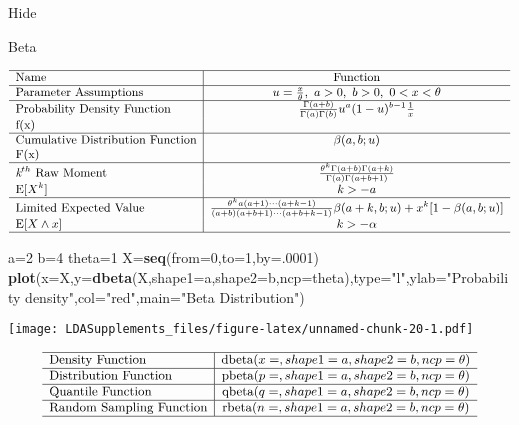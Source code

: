 \documentclass[]{book}
\newenvironment{Shaded}{\begin{snugshade}}{\end{snugshade}}
\newcommand{\KeywordTok}[1]{\textcolor[rgb]{0.13,0.29,0.53}{\textbf{#1}}}
\newcommand{\DataTypeTok}[1]{\textcolor[rgb]{0.13,0.29,0.53}{#1}}
\newcommand{\DecValTok}[1]{\textcolor[rgb]{0.00,0.00,0.81}{#1}}
\newcommand{\StringTok}[1]{\textcolor[rgb]{0.31,0.60,0.02}{#1}}
\newcommand{\NormalTok}[1]{#1}
\begin{document}
\hypertarget{fsB}{}
{Hide}

Beta

\[
{\small
\begin{matrix}
\begin{array}{l|c}
\hline
  \text{Name} & \text{Function} \\
\hline
  \text{Parameter Assumptions} & u=\frac{x}{\theta},~a>0,~b>0,~0<x<\theta \\
\hline
  \text{Probability Density Function} & \frac{\Gamma(a+b)}{\Gamma(a)\Gamma(b)} u^a(1-u)^{b-1}\frac{1}{x} \\
    \text{f(x)} & \\
\hline
  \text{Cumulative Distribution Function} & \beta(a,b;u) \\
    \text{F(x)} & \\
\hline
  \textit{k}^{th}~\text{Raw Moment} & \frac{\theta^k 
  \Gamma(a+b)\Gamma(a+k)}{\Gamma(a)\Gamma(a+b+1)} \\
  \mathrm{E}[X^k]  & k>-a \\
\hline
  \text{Limited Expected Value} & \frac{\theta^k a(a+1)\cdots(a+k-1)}{(a+b)(a+b+1)\cdots(a+b+k-1)}\beta(a+k,b;u)+x^k[1-\beta(a,b;u)]  \\
   \mathrm{E}[X\wedge x] & k > -\alpha \\
\hline
\end{array}
\end{matrix}
}
\]

\begin{Shaded}
\begin{Highlighting}[]
\NormalTok{a=}\DecValTok{2}
\NormalTok{b=}\DecValTok{4}
\NormalTok{theta=}\DecValTok{1}
\NormalTok{X=}\KeywordTok{seq}\NormalTok{(}\DataTypeTok{from=}\DecValTok{0}\NormalTok{,}\DataTypeTok{to=}\DecValTok{1}\NormalTok{,}\DataTypeTok{by=}\NormalTok{.}\DecValTok{0001}\NormalTok{)}
\KeywordTok{plot}\NormalTok{(}\DataTypeTok{x=}\NormalTok{X,}\DataTypeTok{y=}\KeywordTok{dbeta}\NormalTok{(X,}\DataTypeTok{shape1=}\NormalTok{a,}\DataTypeTok{shape2=}\NormalTok{b,}\DataTypeTok{ncp=}\NormalTok{theta),}\DataTypeTok{type=}\StringTok{"l"}\NormalTok{,}\DataTypeTok{ylab=}\StringTok{"Probability density"}\NormalTok{,}\DataTypeTok{col=}\StringTok{"red"}\NormalTok{,}\DataTypeTok{main=}\StringTok{"Beta Distribution"}\NormalTok{)}
\end{Highlighting}
\end{Shaded}

\texttt{[image: LDASupplements\_files/figure-latex/unnamed-chunk-20-1.pdf]}

\[
{\small
\begin{matrix}
\begin{array}{l|c}
\hline
  \text{Density Function} & \text{dbeta}(x=, shape1=a,shape2=b,ncp=\theta) \\
\hline
  \text{Distribution Function} & \text{pbeta}(p=, shape1=a,shape2=b,ncp=\theta) \\
\hline
  \text{Quantile Function} & \text{qbeta}(q=, shape1=a,shape2=b,ncp=\theta) \\ 
\hline
  \text{Random Sampling Function} & \text{rbeta}(n=, shape1=a,shape2=b,ncp=\theta) \\
\hline
\end{array}
\end{matrix}
}
\]
\end{document}

